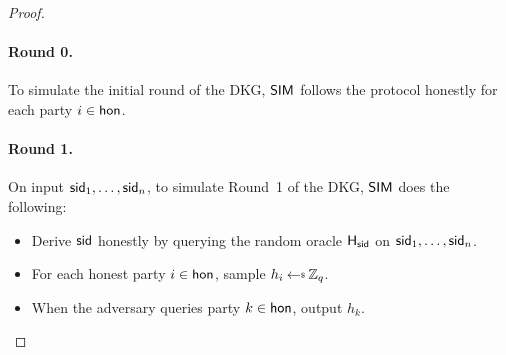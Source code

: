\begin{proof}
    \medskip

    \paragraph{\bf Round 0.}
    To simulate the initial round of the DKG,
    $\mathsf{SIM}$ follows the protocol honestly for each party $i \in \mathsf{hon}$.

    \medskip

    \paragraph{\bf Round 1.}
    On input $\mathsf{sid}_1, \ldots, \mathsf{sid}_n$,
    to simulate Round~1 of the DKG,
    $\mathsf{SIM}$ does the following:
    \begin{itemize}
    \item Derive $\mathsf{sid}$ honestly by querying the random oracle $\mathsf{H_{\mathsf{sid}}}$ on $\mathsf{sid}_1, \ldots, \mathsf{sid}_n$.
    \item  For each honest party $i \in \mathsf{hon}$,
    sample $h_i \rgets \Zq$.
    \item When the adversary queries party $k \in \mathsf{hon}$,
    output $h_k$.
    \end{itemize}

    \medskip


\end{proof}
